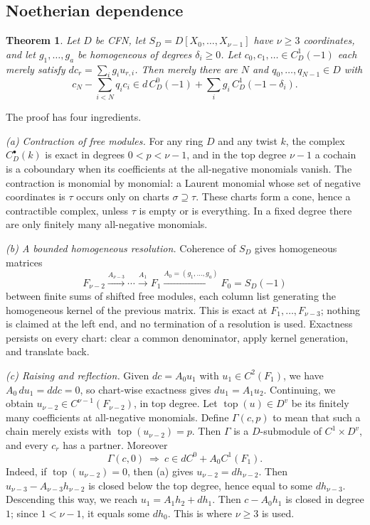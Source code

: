 \documentclass[11pt]{amsart}
\numberwithin{equation}{section}
\newtheorem{theorem}{Theorem}[section]
\theoremstyle{definition}
\theoremstyle{remark}
\DeclareMathOperator{\topc}{top}
\begin{document}
\subsection{Noetherian dependence}

\begin{theorem}\label{thm:dependence}
Let $D$ be CFN, let $S_D=D[X_0,\ldots,X_{\nu-1}]$ have $\nu\ge3$
coordinates, and let $g_1,\ldots,g_a$ be homogeneous of degrees
$\delta_i\ge0$. Let $c_0,c_1,\ldots\in C^1_D(-1)$ each merely satisfy
$dc_r=\sum_ig_iu_{r,i}$. Then merely there are $N$ and
$q_0,\ldots,q_{N-1}\in D$ with
\[
 c_N-\sum_{i<N}q_ic_i\in d\,C^0_D(-1)+\sum_ig_i\,C^1_D(-1-\delta_i).
\]
\end{theorem}

The proof has four ingredients.

\emph{(a) Contraction of free modules.} For any ring $D$ and any twist
$k$, the complex $C^\bullet_D(k)$ is exact in degrees $0<p<\nu-1$, and in
the top degree $\nu-1$ a cochain is a coboundary when its coefficients
at the all-negative monomials vanish. The contraction is monomial by
monomial: a Laurent monomial whose set of negative coordinates is $\tau$
occurs only on charts $\sigma\supseteq\tau$. These charts form a cone,
hence a contractible complex, unless $\tau$ is empty or is everything.
In a fixed degree there are only finitely many all-negative monomials.

\emph{(b) A bounded homogeneous resolution.} Coherence of $S_D$ gives
homogeneous matrices
\[
 F_{\nu-2}\xrightarrow{A_{\nu-3}}\cdots\xrightarrow{A_1}F_1
 \xrightarrow{A_0=(g_1,\ldots,g_a)}F_0=S_D(-1)
\]
between finite sums of shifted free modules, each column list generating
the homogeneous kernel of the previous matrix. This is exact at
$F_1,\ldots,F_{\nu-3}$; nothing is claimed at the left end, and no
termination of a resolution is used. Exactness persists on every chart:
clear a common denominator, apply kernel generation, and translate back.

\emph{(c) Raising and reflection.} Given $dc=A_0u_1$ with
$u_1\in C^2(F_1)$, we have $A_0\,du_1=ddc=0$, so chart-wise exactness
gives $du_1=A_1u_2$. Continuing, we obtain $u_{\nu-2}\in C^{\nu-1}(F_{\nu-2})$,
in top degree. Let $\topc(u)\in D^v$ be its finitely many coefficients at
all-negative monomials. Define $\Gamma(c,p)$ to mean that such a chain
merely exists with $\topc(u_{\nu-2})=p$. Then $\Gamma$ is a
$D$-submodule of $C^1\times D^v$, and every $c_r$ has a partner. Moreover
\[
 \Gamma(c,0)\ \Longrightarrow\ c\in dC^0+A_0C^1(F_1).
\]
Indeed, if $\topc(u_{\nu-2})=0$, then (a) gives $u_{\nu-2}=dh_{\nu-2}$.
Then $u_{\nu-3}-A_{\nu-3}h_{\nu-2}$ is closed below the top degree, hence
equal to some $dh_{\nu-3}$. Descending this way, we reach
$u_1=A_1h_2+dh_1$. Then $c-A_0h_1$ is closed in degree $1$; since
$1<\nu-1$, it equals some $dh_0$. This is where $\nu\ge3$ is used.
\end{document}
